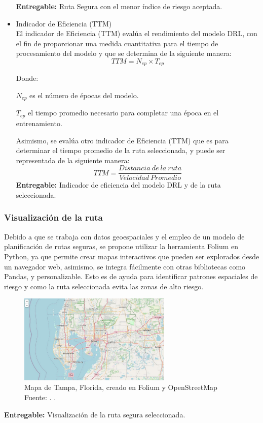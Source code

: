 \begin{itemize}
\textbf{Entregable:} Ruta Segura con el menor índice de riesgo aceptada.
	\item Indicador de Eficiencia (TTM) \\
El indicador de Eficiencia (TTM) evalúa el rendimiento del modelo DRL, con el fin de proporcionar una medida cuantitativa para el tiempo de procesamiento del modelo y que se determina de la siguiente manera:
\begin{equation} 
	TTM = N_{ep} \times T_{ep}
\end{equation}

Donde: 

$N_{ep}$ es el número de épocas del modelo.

$T_{ep}$ el tiempo promedio necesario para completar una época en el entrenamiento.

Asimismo, se evalúa otro indicador de Eficiencia (TTM) que es para determinar el tiempo promedio de la ruta seleccionada, y puede ser representada de la siguiente manera:
\begin{equation} 
	TTM = \frac{Distancia \:de \:la\: ruta}{Velocidad \: Promedio}
\end{equation}
\textbf{Entregable:} Indicador de eficiencia del modelo DRL y de la ruta seleccionada.
\end{itemize}
\subsubsection{Visualización de la ruta}
Debido a que se trabaja con datos geoespaciales y el empleo de un modelo de planificación de rutas seguras, se propone utilizar la herramienta Folium en Python, ya que permite crear mapas interactivos que pueden ser explorados desde un navegador web, asimismo, se integra fácilmente con otras bibliotecas como Pandas, y personalizable. Esto es de ayuda para identificar patrones espaciales de riesgo y como la ruta seleccionada evita las zonas de alto riesgo.
	\begin{figure}[h]
	\begin{center}
		\includegraphics[width=0.65\textwidth]{3/figures/florida.jpg}
		\caption[Mapa de Tampa, Florida, creado en Folium y OpenStreetMap]{Mapa de Tampa, Florida, creado en Folium y OpenStreetMap\\
			Fuente: \citep*{gl_folium}. .}
		\label{1:fig}
	\end{center}
\end{figure}
\textbf{Entregable:} Visualización de la ruta segura seleccionada.

